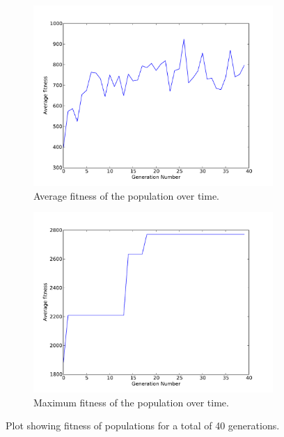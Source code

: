 \documentclass{article}
\begin{document}
\begin{figure}[h!]
\centering
\begin{subfigure}[b]{0.49\textwidth}
	\center
	\includegraphics[width=\textwidth]{images/fitness}
  \caption{Average fitness of the population over time.}
  \label{fig:avg}
\end{subfigure}
\begin{subfigure}[b]{0.49\textwidth}
  \center
  \includegraphics[width=\textwidth]{images/max_fitness}
  \caption{Maximum fitness of the population over time.}
  \label{fig:max}
\end{subfigure}
\caption{Plot showing fitness of populations for a total of 40 generations.}
\label{fig:fitness}
\end{figure}
\end{document}
